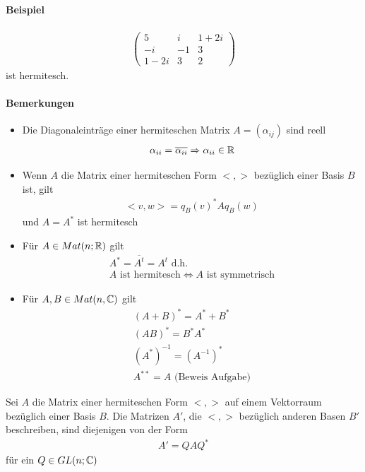 \paragraph{Beispiel}
\begin{align}
\begin{pmatrix} 5 & i & 1 + 2i \\ -i & -1 & 3 \\ 1-2i & 3 & 2\end{pmatrix}
\end{align}
ist hermitesch.

\paragraph{Bemerkungen}
\begin{itemize}
\item Die Diagonaleinträge einer hermiteschen Matrix $A = (\alpha_{ij})$ sind reell
\begin{align}
\alpha_{ii} = \overline{\alpha_{ii}} \Rightarrow \alpha_{ii} \in \mathbb{R}
\end{align}
\item Wenn $A$ die Matrix einer hermiteschen Form $<, >$ bezüglich einer Basis $B$ ist, gilt
\begin{align}
<v, w> = q_B(v)^{*} A q_B(w)
\end{align}
und $A = A^{*}$ ist hermitesch

\item Für $A \in Mat(n; \mathbb{R})$ gilt
\begin{align}
A^{*} = \overline{A^{t}} = A^t \text{ d.h.} \\
\text{$A$ ist hermitesch} \Leftrightarrow \text{$A$ ist symmetrisch}
\end{align}

\item Für $A, B \in Mat(n, \mathbb{C})$ gilt
\begin{align}
(A+B)^{*} = A^{*} + B^{*} \\
(AB)^{*} = B^{*} A^{*} \\
(A^{*})^{-1} = (A^{-1})^{*} \\
A^{**} = A  \text{ (Beweis Aufgabe)}
\end{align}
\end{itemize}

\begin{satz}
\label{satz541}
Sei $A$ die Matrix einer hermiteschen Form $<, >$ auf einem Vektorraum bezüglich einer Basis $B$. Die Matrizen $A'$, die $<, >$ bezüglich anderen Basen $B'$ beschreiben, sind diejenigen von der Form 
\begin{align}
A' = QAQ^{*}
\end{align}
für ein $Q \in GL(n; \mathbb{C})$
\end{satz}

